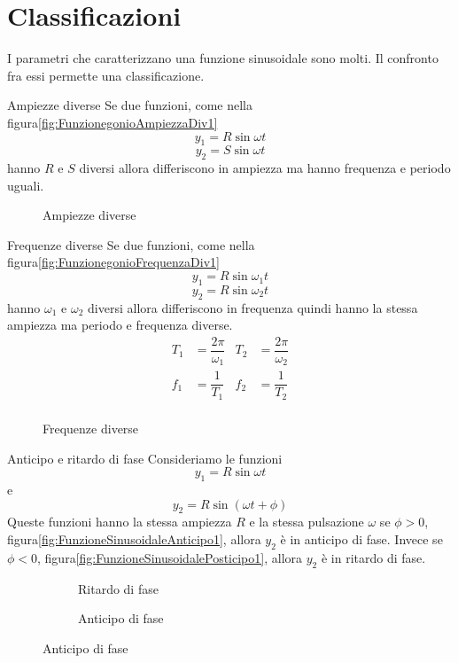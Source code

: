\section{Classificazioni}
I parametri che caratterizzano una funzione sinusoidale sono molti. Il confronto fra essi permette una classificazione.
\begin{definizionet}{Ampiezze diverse}{}
 Se due funzioni, come nella figura\nobs\vref{fig:FunzionegonioAmpiezzaDiv1}  \[y_1=R\sin\omega t\] \[y_2=S\sin\omega t\] hanno $R$ e $S$ diversi allora differiscono in ampiezza ma hanno frequenza e periodo uguali.
\end{definizionet}
\begin{figure}
	\centering
	
	\caption{Ampiezze diverse}
	\label{fig:FunzionegonioAmpiezzaDiv1}
\end{figure}
\begin{definizionet}{Frequenze diverse}{}
	Se due funzioni, come nella figura\nobs\vref{fig:FunzionegonioFrequenzaDiv1} \[y_1=R\sin\omega_1 t\] \[y_2=R\sin\omega_2 t\] hanno $\omega_1$ e $\omega_2$ diversi allora differiscono in frequenza quindi hanno la stessa ampiezza ma periodo e frequenza diverse.
	\begin{align*}
		T_1&=\dfrac{2\pi}{\omega_1}& T_2&=\dfrac{2\pi}{\omega_2}\\
		f_1&=\dfrac{1}{T_1}& f_2&=\dfrac{1}{T_2}\\
	\end{align*}
\end{definizionet}
\begin{figure}
	\centering
	
	\caption{Frequenze diverse}
	\label{fig:FunzionegonioFrequenzaDiv1}
\end{figure}
\begin{definizionet}{Anticipo e ritardo di fase}{}
	Consideriamo le funzioni \[y_1=R\sin\omega t\] e\[y_2=R\sin(\omega t +\phi)\] Queste funzioni hanno la stessa ampiezza $R$ e la stessa pulsazione $\omega$ se $\phi>0$, figura\nobs\vref{fig:FunzioneSinusoidaleAnticipo1}, allora $y_2$ è in anticipo di fase. Invece se $\phi<0$, figura\nobs\vref{fig:FunzioneSinusoidalePosticipo1}, allora $y_2$ è in ritardo di fase.
\end{definizionet}
\begin{figure}
	\begin{subfigure}[b]{.5\linewidth}
		\centering
		
		\caption{Ritardo di fase}\label{fig:FunzioneSinusoidaleAnticipo1}
	\end{subfigure}%
	\begin{subfigure}[b]{.5\linewidth}
		\centering
		
		\caption{Anticipo di fase}\label{fig:FunzioneSinusoidalePosticipo1}
	\end{subfigure}
	\label{fig:sinuoAnticipoPosticipo}
\end{figure}
